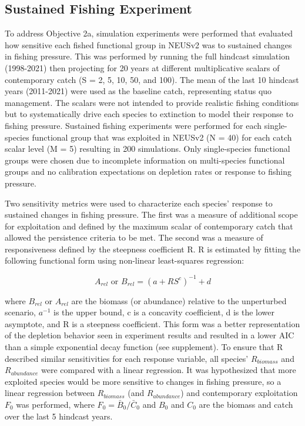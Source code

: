 \documentclass[
]{article}
\begin{document}
\subsection{Sustained Fishing Experiment}\label{sustained-fishing-experiment}

To address Objective 2a, simulation experiments were performed that evaluated how sensitive each fished functional group in NEUSv2 was to sustained changes in fishing pressure. This was performed by running the full hindcast simulation (1998-2021) then projecting for 20 years at different multiplicative scalars of contemporary catch (S = 2, 5, 10, 50, and 100). The mean of the last 10 hindcast years (2011-2021) were used as the baseline catch, representing status quo management. The scalars were not intended to provide realistic fishing conditions but to systematically drive each species to extinction to model their response to fishing pressure. Sustained fishing experiments were performed for each single-species functional group that was exploited in NEUSv2 (N = 40) for each catch scalar level (M = 5) resulting in 200 simulations. Only single-species functional groups were chosen due to incomplete information on multi-species functional groups and no calibration expectations on depletion rates or response to fishing pressure.

Two sensitivity metrics were used to characterize each species' response to sustained changes in fishing pressure. The first was a measure of additional scope for exploitation and defined by the maximum scalar of contemporary catch that allowed the persistence criteria to be met. The second was a measure of responsiveness defined by the steepness coefficient R. R is estimated by fitting the following functional form using non-linear least-squares regression:

\begin{equation}
  A_{rel} \text{ or } B_{rel} = (a + RS^{c})^{-1} + d
  \label{eq:responsiveness}
\end{equation}

where \(B_{rel}\) or \(A_{rel}\) are the biomass (or abundance) relative to the unperturbed scenario, \(a^{-1}\) is the upper bound, c is a concavity coefficient, d is the lower asymptote, and R is a steepness coefficient. This form was a better representation of the depletion behavior seen in experiment results and resulted in a lower AIC than a simple exponential decay function (see supplement). To ensure that R described similar sensitivities for each response variable, all species' \(R_{biomass}\) and \(R_{abundance}\) were compared with a linear regression. It was hypothesized that more exploited species would be more sensitive to changes in fishing pressure, so a linear regression between \(R_{biomass}\) (and \(R_{abundance}\)) and contemporary exploitation \(F_0\) was performed, where \(F_{0} = \bar{B}_{0} / \bar{C}_{0}\) and \(B_0\) and \(C_0\) are the biomass and catch over the last 5 hindcast years.
\end{document}
